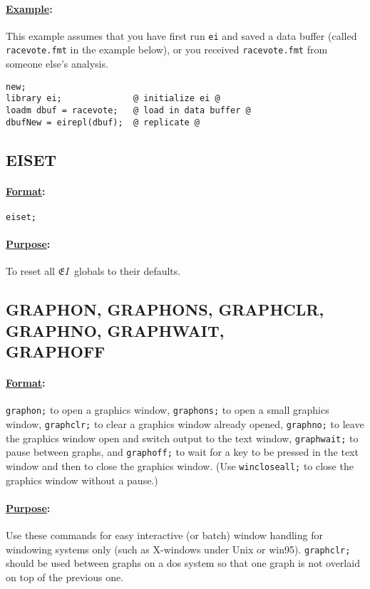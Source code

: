 \documentclass[11pt,titlepage]{article}
\newcommand{\EI}{\ensuremath{{\mathfrak EI}}}
\begin{document}
\paragraph{\underline{Example}:}
This example assumes that you have first run \texttt{ei} and saved a
data buffer (called \texttt{racevote.fmt} in the example below), or
you received \texttt{racevote.fmt} from someone else's analysis.
\begin{verbatim}
new;
library ei;              @ initialize ei @
loadm dbuf = racevote;   @ load in data buffer @
dbufNew = eirepl(dbuf);  @ replicate @
\end{verbatim}

\subsection{EISET}

\paragraph{\underline{Format}:} \texttt{eiset;}

\paragraph{\underline{Purpose}:}
To reset all \EI\ globals to their defaults.

\subsection{GRAPHON, GRAPHONS, GRAPHCLR, GRAPHNO, GRAPHWAIT,\\
GRAPHOFF}
 \label{graph}

\paragraph{\underline{Format}:}
\texttt{graphon;} to open a graphics window, \texttt{graphons;} to
open a small graphics window, \texttt{graphclr;} to clear a graphics
window already opened, \texttt{graphno;} to leave the graphics window
open and switch output to the text window, \texttt{graphwait;} to
pause between graphs, and \texttt{graphoff;} to wait for a key to be
pressed in the text window and then to close the graphics window.
(Use \texttt{wincloseall;} to close the graphics window without a
pause.)

\paragraph{\underline{Purpose}:} Use these commands for easy
interactive (or batch) window handling for windowing systems only
(such as X-windows under Unix or win95).  \texttt{graphclr;} should be
used between graphs on a dos system so that one graph is not overlaid
on top of the previous one.
\end{document}
